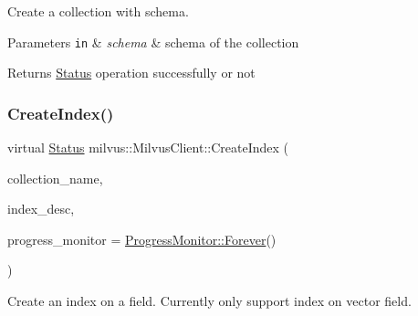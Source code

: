 Create a collection with schema.


\begin{DoxyParams}[1]{Parameters}
\mbox{\tt in}  & {\em schema} & schema of the collection \\
\hline
\end{DoxyParams}
\begin{DoxyReturn}{Returns}
\hyperlink{classmilvus_1_1_status}{Status} operation successfully or not 
\end{DoxyReturn}
\mbox{\label{classmilvus_1_1_milvus_client_a9d56f35a497504a7dee610d368d22b7a}} 
\subsubsection{\texorpdfstring{Create\+Index()}{CreateIndex()}}
{\footnotesize\ttfamily virtual \hyperlink{classmilvus_1_1_status}{Status} milvus\+::\+Milvus\+Client\+::\+Create\+Index (\begin{DoxyParamCaption}\item[{const std\+::string \&}]{collection\+\_\+name,  }\item[{const \hyperlink{classmilvus_1_1_index_desc}{Index\+Desc} \&}]{index\+\_\+desc,  }\item[{const \hyperlink{classmilvus_1_1_progress_monitor}{Progress\+Monitor} \&}]{progress\+\_\+monitor = {\ttfamily \hyperlink{classmilvus_1_1_progress_monitor_afad65b07af8419780f2457992ee7ce7d}{Progress\+Monitor\+::\+Forever}()} }\end{DoxyParamCaption})\hspace{0.3cm}{\ttfamily [pure virtual]}}

Create an index on a field. Currently only support index on vector field.


